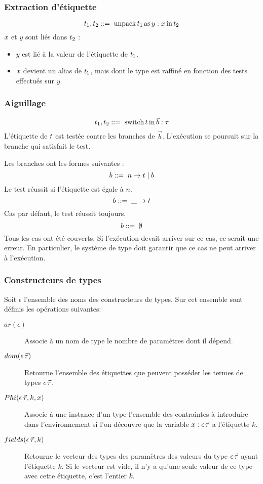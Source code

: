 \subsubsection{Extraction d'étiquette} 

$$t_1, t_2 ::= \; \operatorname{unpack} t_1 \operatorname{as} y : x \operatorname{in} t_2$$
%
$x$ et $y$ sont liés dans $t_2$ :
\begin{itemize}
  \item $y$ est lié à la valeur de l'étiquette de $t_1$.
  \item $x$ devient un alias de $t_1$, mais dont le type est raffiné en
    fonction des tests effectués sur $y$.
\end{itemize}

\subsubsection{Aiguillage} 

$$t_1, t_2 ::= \; \operatorname{switch} t \operatorname{in} \vec{b} : \tau$$
%
L'étiquette de $t$ est testée contre les branches de $\vec{b}$.
L'exécution se poursuit sur la branche qui satisfait le test.

Les branches ont les formes suivantes :
%
$$b ::= \; n \rightarrow t \; | \; b$$
%
Le test réussit si l'étiquette est égale à $n$.
%
$$b ::= \;  \_ \rightarrow t$$
%
Cas par défaut, le test réussit toujours.
%
$$b ::= \; \emptyset$$
%
Tous les cas ont été couverts. Si l'exécution devait arriver sur ce cas, ce
serait une erreur. En particulier, le système de type doit garantir que ce cas
ne peut arriver à l'exécution.

\subsubsection{Constructeurs de types}

Soit $\epsilon$ l'ensemble des noms des constructeurs de types.
Sur cet ensemble sont définis les opérations suivantes:
\begin{description}
  \item[$ar(\epsilon)$] Associe à un nom de type le nombre de paramètres dont il
    dépend.
  \item[$dom(\epsilon \, \vec{\tau})$] Retourne l'ensemble des étiquettes que peuvent posséder
    les termes de types $\epsilon \, \vec{\tau}$.
  \item[$Phi(\epsilon \, \vec{\tau}, k, x)$] Associe à une instance d'un type
    l'ensemble des contraintes à introduire dans l'environnement si l'on
    découvre que la variable $x : \epsilon \, \vec{\tau}$ a l'étiquette $k$.
  \item[$fields(\epsilon \, \vec{\tau},k)$] Retourne le vecteur des types des paramètres des
    valeurs du type $\epsilon \, \vec{\tau}$ ayant l'étiquette $k$. Si le vecteur est vide,
     il n'y a qu'une seule valeur de ce type avec cette étiquette,
     c'est l'entier $k$.
\end{description}

